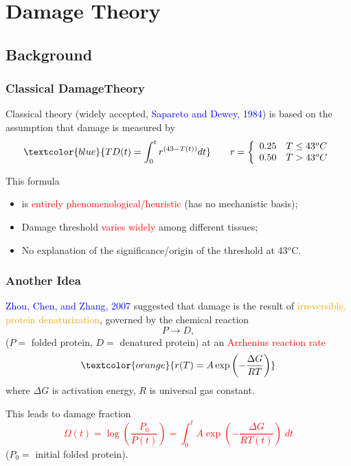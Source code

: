 \documentclass{beamer}
\begin{document}
\section{Damage Theory}
\subsection{Background}
\begin{frame}
\frametitle{Classical DamageTheory}
Classical theory (widely accepted, \textcolor{blue}{Sapareto and Dewey, 1984}) is based on the assumption that damage  is measured by 
\begin{equation*}
\textcolor{blue}{TD(t) = \int_0^tr^{(43-T(t))}dt}\qquad r = \left\{\begin{array}{cc}0.25 & T\le43^oC\\0.50&T>43^oC\end{array}\right.
\end{equation*}

This formula 
\begin{itemize}
\item is \textcolor{red}{entirely phenomenological/heuristic} (has no mechanistic basis);
\item Damage threshold \textcolor{red}{varies widely} among different tissues;
\item No explanation of the significance/origin of the threshold at 43$^o$C.
\end{itemize}



\end{frame}

\begin{frame}
\frametitle{Another Idea}
\textcolor{blue}{Zhou, Chen, and  Zhang, 2007} suggested that damage is the result of \textcolor{orange}{irreversible, protein denaturization}, governed by the chemical reaction
\begin{equation*}
P\rightarrow D,
\end{equation*}
($P =$ folded protein, $D=$ denatured protein) at an \textcolor{red}{Arrhenius reaction rate}
\begin{equation*}
\textcolor{orange}{r(T) = A\exp\left(-\frac{\Delta G}{RT}\right)}
\end{equation*}
where $\Delta G$ is activation energy, $R$ is universal gas constant.

This leads to damage fraction
\textcolor{red}
{
\begin{equation*}
\Omega(t) = \log\left(\frac{P_0}{P(t)}\right) = \int_0^tA\exp\left(-\frac{\Delta G}{RT(t)}\right) \; dt
\end{equation*}
}
($P_0=$ initial folded protein).
 
\end{frame}
 
\end{document}

